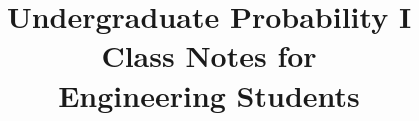 \documentclass[12pt,openany]{book}
\begin{document}
\author{}
\title{
\Huge{Undergraduate Probability I}\\[5mm]
\Large{Class Notes for\\Engineering Students}}

\frontmatter
\maketitle

\tableofcontents

%

\mainmatter

















%

\printindex
\end{document}

